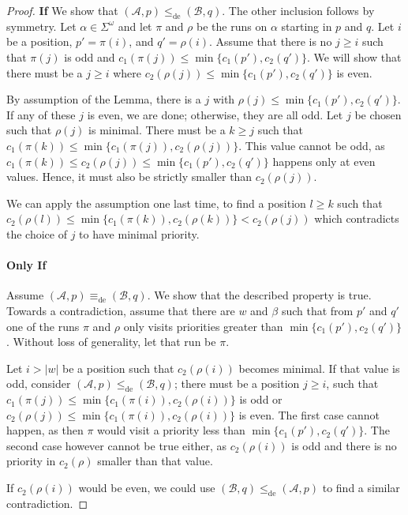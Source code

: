 \begin{proof}
	\textbf{If } We show that $(\mathcal{A}, p) \leq_\text{de} (\mathcal{B}, q)$. The other inclusion follows by symmetry. Let $\alpha \in \Sigma^\omega$ and let $\pi$ and $\rho$ be the runs on $\alpha$ starting in $p$ and $q$. Let $i$ be a position, $p' = \pi(i)$, and $q' = \rho(i)$. Assume that there is no $j \geq i$ such that $\pi(j)$ is odd and $c_1(\pi(j)) \leq \min \{c_1(p'), c_2(q')\}$. We will show that there must be a $j \geq i$ where $c_2(\rho(j)) \leq \min \{c_1(p'), c_2(q')\}$ is even.
	
	By assumption of the Lemma, there is a $j$ with $\rho(j) \leq \min \{c_1(p'), c_2(q')\}$. If any of these $j$ is even, we are done; otherwise, they are all odd. Let $j$ be chosen such that $\rho(j)$ is minimal. There must be a $k \geq j$ such that $c_1(\pi(k)) \leq \min \{c_1(\pi(j)), c_2(\rho(j))\}$. This value cannot be odd, as $c_1(\pi(k)) \leq c_2(\rho(j)) \leq \min \{c_1(p'), c_2(q')\}$ happens only at even values. Hence, it must also be strictly smaller than $c_2(\rho(j))$.
	
	We can apply the assumption one last time, to find a position $l \geq k$ such that $c_2(\rho(l)) \leq \min \{c_1(\pi(k)), c_2(\rho(k))\} < c_2(\rho(j))$ which contradicts the choice of $j$ to have minimal priority.
	
	\paragraph{Only If } Assume $(\mathcal{A}, p) \equiv_\text{de} (\mathcal{B}, q)$. We show that the described property is true. Towards a contradiction, assume that there are $w$ and $\beta$ such that from $p'$ and $q'$ one of the runs $\pi$ and $\rho$ only visits priorities greater than $\min \{c_1(p'), c_2(q')\}$. Without loss of generality, let that run be $\pi$.
	
	Let $i > |w|$ be a position such that $c_2(\rho(i))$ becomes minimal. If that value is odd, consider $(\mathcal{A}, p) \leq_\text{de} (\mathcal{B}, q)$; there must be a position $j \geq i$, such that $c_1(\pi(j)) \leq \min \{c_1(\pi(i)), c_2(\rho(i))\}$ is odd or $c_2(\rho(j)) \leq \min \{c_1(\pi(i)), c_2(\rho(i))\}$ is even. The first case cannot happen, as then $\pi$ would visit a priority less than $\min \{c_1(p'), c_2(q')\}$. The second case however cannot be true either, as $c_2(\rho(i))$ is odd and there is no priority in $c_2(\rho)$ smaller than that value. 
	
	If $c_2(\rho(i))$ would be even, we could use $(\mathcal{B}, q) \leq_\text{de} (\mathcal{A}, p)$ to find a similar contradiction.
\end{proof}

